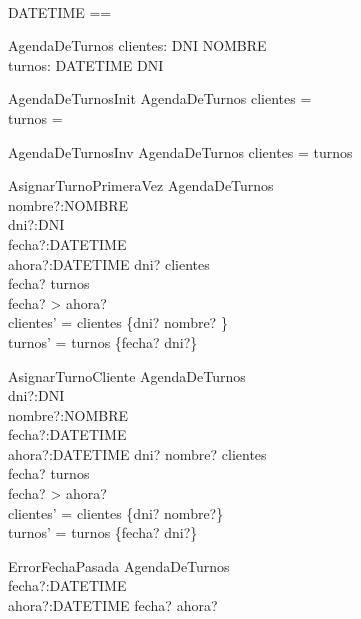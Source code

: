 \begin{zed}
 \\
DATETIME == \nat
\end{zed}

\begin{schema}{AgendaDeTurnos}
clientes: DNI \pfun NOMBRE \\
turnos: DATETIME \pfun DNI
\end{schema}

\begin{schema}{AgendaDeTurnosInit}
AgendaDeTurnos
\where
clientes = \emptyset \\
turnos = \emptyset
\end{schema}

\begin{schema}{AgendaDeTurnosInv}
AgendaDeTurnos
\where
\dom clientes = \ran turnos
\end{schema}

\begin{schema}{AsignarTurnoPrimeraVez}
\Delta AgendaDeTurnos \\
nombre?:NOMBRE \\
dni?:DNI \\
fecha?:DATETIME \\
ahora?:DATETIME
\where
dni? \notin \dom clientes \\
fecha? \notin \dom turnos \\
fecha? > ahora? \\
clientes' = clientes \cup \{dni? \mapsto nombre? \} \\
turnos' = turnos \cup \{fecha? \mapsto dni?\}
\end{schema}

\begin{schema}{AsignarTurnoCliente}
\Delta AgendaDeTurnos \\
dni?:DNI \\
nombre?:NOMBRE \\
fecha?:DATETIME \\
ahora?:DATETIME
\where
dni? \mapsto nombre? \in clientes \\
fecha? \notin \dom turnos \\
fecha? > ahora? \\
clientes' = clientes \cup \{dni? \mapsto nombre?\} \\
turnos' = turnos \cup \{fecha? \mapsto dni?\}
\end{schema}

\begin{schema}{ErrorFechaPasada}
\Xi AgendaDeTurnos \\
fecha?:DATETIME \\
ahora?:DATETIME
\where
fecha? \leq ahora?
\end{schema}

